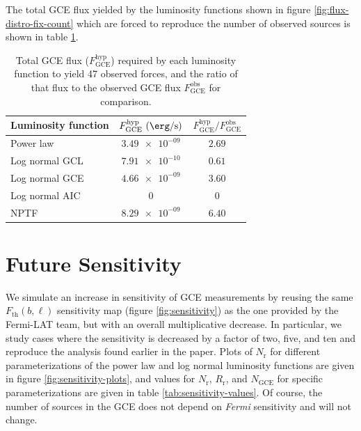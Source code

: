 \documentclass[a4paper,11pt]{article}
\newcommand{\comment}[1]{\emph{\color{red}{#1}}}
\begin{document}
The total GCE flux yielded by the luminosity functions shown in figure \ref{fig:flux-distro-fix-count} which are forced to reproduce the number of observed sources is shown in table \ref{tab:rescaled-gce-flux}.

\begin{table}
    \centering
    \begin{tabular} {|l|c|c|}
        \hline
        Luminosity function & $F_\text{GCE}^\text{hyp}\ (\SI{}{\erg\per\second})$ & $F^\text{hyp}_\text{GCE} / F^\text{obs}_\text{GCE}$\\ \hline \hline
        Power law & $\num{3.49e-09}$ & $\num{2.69}$\\
        Log normal GCL & $\num{7.91e-10}$ & $\num{0.61}$ \\
        Log normal GCE & $\num{4.66e-09}$ & $\num{3.60}$\\
        Log normal AIC & $\num{0}$ & $\num{0}$ \\
        NPTF & $\num{8.29e-09}$ & $\num{6.40}$\\
        \hline
    \end{tabular}
    \caption{Total GCE flux ($F_\text{GCE}^\text{hyp}$) required by each luminosity function to yield 47 observed forces, and the ratio of that flux to the observed GCE flux $F_\text{GCE}^\text{obs}$ for comparison.}
    \label{tab:rescaled-gce-flux}
\end{table}



\section{Future Sensitivity}
We simulate an increase in sensitivity of GCE measurements by reusing the same $F_\text{th}(b, \ell)$ sensitivity map (figure \ref{fig:sensitivity}) as the one provided by the Fermi-LAT team, but with an overall multiplicative decrease. In particular, we study cases where the sensitivity is decreased by a factor of two, five, and ten and reproduce the analysis found earlier in the paper. Plots of $N_\text{r}$ for different parameterizations of the power law and log normal luminosity functions are given in figure \ref{fig:sensitivity-plots}, and values for $N_\text{r}$, $R_\text{r}$, and $N_\text{GCE}$ for specific parameterizations are given in table \ref{tab:sensitivity-values}. Of course, the number of sources in the GCE does not depend on \textit{Fermi} sensitivity and will not change. \comment{That means that the backgrounds of the column plots do not change from plot to plot. I could put them all on the same thing.}
\end{document}
